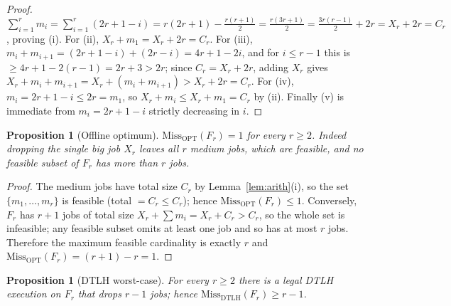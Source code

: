 \documentclass{amsart}
\newtheorem{proposition}[theorem]{Proposition}
\theoremstyle{definition}
\begin{document}
\begin{proof}
$\sum_{i=1}^r m_i=\sum_{i=1}^r(2r+1-i)=r(2r+1)-\tfrac{r(r+1)}2
=\tfrac{r(3r+1)}2=\tfrac{3r(r-1)}2+2r=X_r+2r=C_r$, proving (i). For (ii),
$X_r+m_1=X_r+2r=C_r$. For (iii), $m_i+m_{i+1}=(2r+1-i)+(2r-i)=4r+1-2i$, and for
$i\le r-1$ this is $\ge 4r+1-2(r-1)=2r+3>2r$; since $C_r=X_r+2r$, adding $X_r$
gives $X_r+m_i+m_{i+1}=X_r+(m_i+m_{i+1})>X_r+2r=C_r$. For (iv),
$m_i=2r+1-i\le 2r=m_1$, so $X_r+m_i\le X_r+m_1=C_r$ by (ii). Finally (v) is
immediate from $m_i=2r+1-i$ strictly decreasing in $i$.
\end{proof}

\begin{proposition}[Offline optimum]\label{prop:family-opt}
$\mathrm{Miss}_{\mathrm{OPT}}(F_r)=1$ for every $r\ge 2$. Indeed dropping the
single big job $X_r$ leaves all $r$ medium jobs, which are feasible, and no
feasible subset of $F_r$ has more than $r$ jobs.
\end{proposition}

\begin{proof}
The medium jobs have total size $C_r$ by Lemma~\ref{lem:arith}(i), so the set
$\{m_1,\dots,m_r\}$ is feasible (total $=C_r\le C_r$); hence
$\mathrm{Miss}_{\mathrm{OPT}}(F_r)\le 1$. Conversely, $F_r$ has $r+1$ jobs of
total size $X_r+\sum m_i=X_r+C_r>C_r$, so the whole set is infeasible; any
feasible subset omits at least one job and so has at most $r$ jobs. Therefore the
maximum feasible cardinality is exactly $r$ and
$\mathrm{Miss}_{\mathrm{OPT}}(F_r)=(r+1)-r=1$.
\end{proof}

\begin{proposition}[DTLH worst-case]\label{prop:family-dtlh}
For every $r\ge 2$ there is a legal DTLH execution on $F_r$ that drops $r-1$
jobs; hence $\mathrm{Miss}_{\mathrm{DTLH}}(F_r)\ge r-1$.
\end{proposition}
\end{document}
